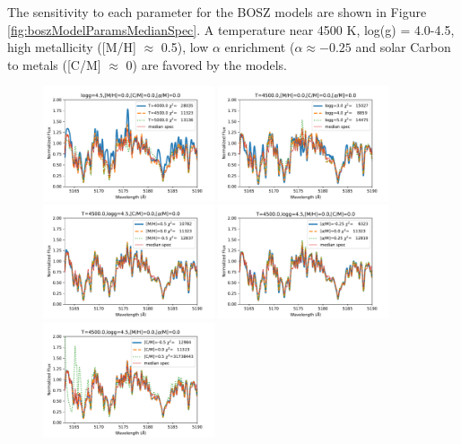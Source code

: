 \documentclass[twocolumn]{aastex61}
\begin{document}
The sensitivity to each parameter for the BOSZ models are shown in Figure \ref{fig:boszModelParamsMedianSpec}.
A temperature near 4500 K, log(g) = 4.0-4.5, high metallicity ([M/H] $\approx$ 0.5), low $\alpha$ enrichment ($\alpha \approx -0.25$ and solar Carbon to metals ([C/M] $\approx$ 0) are favored by the models.

\begin{figure}[!hbtp]
\begin{centering}
\includegraphics[width=0.45\textwidth]{images/bosz_model_exploration/T_EFF_exploration.pdf}
\includegraphics[width=0.45\textwidth]{images/bosz_model_exploration/LOGG_exploration}
\includegraphics[width=0.45\textwidth]{images/bosz_model_exploration/MH_exploration.pdf}
\includegraphics[width=0.45\textwidth]{images/bosz_model_exploration/ALPHA_exploration.pdf}
\includegraphics[width=0.45\textwidth]{images/bosz_model_exploration/CM_exploration.pdf}

\end{centering}
\end{figure}
\end{document}
